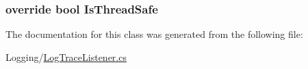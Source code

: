\subsubsection[{Is\+Thread\+Safe}]{\setlength{\rightskip}{0pt plus 5cm}override bool Is\+Thread\+Safe\hspace{0.3cm}{\ttfamily [get]}}\label{classOTA_1_1Logging_1_1LogTraceListener_a59b7f364aa56891e8d1c197ef983b687}


The documentation for this class was generated from the following file\+:\begin{DoxyCompactItemize}
\item 
Logging/\hyperlink{LogTraceListener_8cs}{Log\+Trace\+Listener.\+cs}\end{DoxyCompactItemize}
